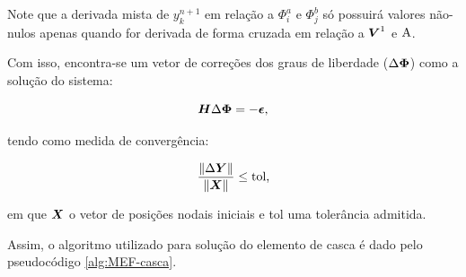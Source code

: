 Note que a derivada mista de $y_k^{n+1}$ em relação a $\Phi_i^a$ e $\Phi_j^b$ só possuirá valores não-nulos apenas quando for derivada de forma cruzada em relação a $\boldsymbol{V}^1$ e $\mathrm{A}$.

Com isso, encontra-se um vetor de correções dos graus de liberdade ($\Delta\boldsymbol{\Phi}$) como a solução do sistema:

\begin{equation}
    \boldsymbol{H}\Delta\boldsymbol{\Phi}=-\boldsymbol{\epsilon}\text{,}
\end{equation}

\noindent tendo como medida de convergência:

\begin{equation}
    \frac{\left\lVert{\Delta\boldsymbol{Y}}\right\lVert}{\left\lVert{\boldsymbol{X}}\right\lVert}\leq\text{tol,}
    \label{eq:CSD-erro}
\end{equation}

\noindent em que $\boldsymbol{X}$ o vetor de posições nodais iniciais e tol uma tolerância admitida.

Assim, o algoritmo utilizado para solução do elemento de casca é dado pelo pseudocódigo \ref{alg:MEF-casca}.

